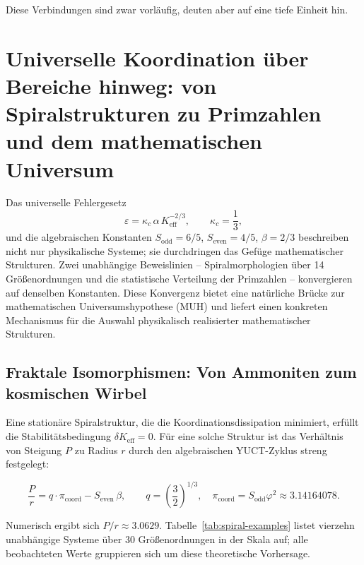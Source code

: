 \documentclass[12pt]{article}
\newcommand{\Keff}{K_{\mathrm{eff}}}
\newcommand{\eps}{\varepsilon}
\newcommand{\kappac}{\kappa_c}
\begin{document}
	Diese Verbindungen sind zwar vorläufig, deuten aber auf eine tiefe Einheit hin.
	
	\section{Universelle Koordination über Bereiche hinweg: von Spiralstrukturen zu Primzahlen und dem mathematischen Universum}
	\label{sec:universal}
	
	Das universelle Fehlergesetz
	\begin{equation}
		\eps = \kappac\,\alpha\,\Keff^{-2/3}, \qquad \kappac = \frac{1}{3},
		\label{eq:errorlaw}
	\end{equation}
	und die algebraischen Konstanten \(S_{\mathrm{odd}}=6/5\), \(S_{\mathrm{even}}=4/5\), \(\beta=2/3\) beschreiben nicht nur physikalische Systeme; sie durchdringen das Gefüge mathematischer Strukturen. Zwei unabhängige Beweislinien – Spiralmorphologien über 14 Größenordnungen und die statistische Verteilung der Primzahlen – konvergieren auf denselben Konstanten. Diese Konvergenz bietet eine natürliche Brücke zur mathematischen Universumshypothese (MUH) und liefert einen konkreten Mechanismus für die Auswahl physikalisch realisierter mathematischer Strukturen.
	
	\subsection{Fraktale Isomorphismen: Von Ammoniten zum kosmischen Wirbel}
	
	Eine stationäre Spiralstruktur, die die Koordinationsdissipation minimiert, erfüllt die Stabilitätsbedingung \(\delta K_{\mathrm{eff}} = 0\). Für eine solche Struktur ist das Verhältnis von Steigung \(P\) zu Radius \(r\) durch den algebraischen YUCT-Zyklus streng festgelegt:
	
	\begin{equation}
		\boxed{ \frac{P}{r} = q \cdot \pi_{\mathrm{coord}} - S_{\mathrm{even}} \, \beta }, \qquad
		q = \left(\frac{3}{2}\right)^{1/3},\quad
		\pi_{\mathrm{coord}} = S_{\mathrm{odd}} \varphi^2 \approx 3.14164078.
		\label{eq:spiral-universal}
	\end{equation}
	
	Numerisch ergibt sich \(P/r \approx 3.0629\). Tabelle~\ref{tab:spiral-examples} listet vierzehn unabhängige Systeme über 30 Größenordnungen in der Skala auf; alle beobachteten Werte gruppieren sich um diese theoretische Vorhersage.
	
\end{document}
